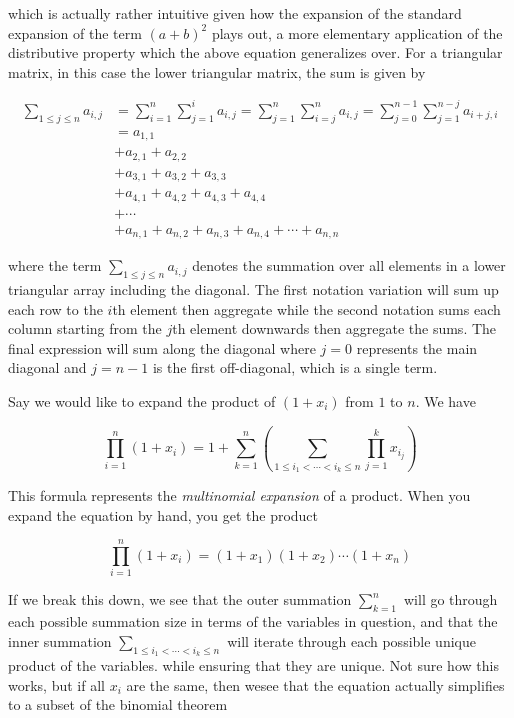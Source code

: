 \documentclass[12pt]{article}
\begin{document}
which is actually rather intuitive given how the expansion of the standard expansion of the term $(a+b)^2$ plays out, a more elementary application of the distributive property which the above equation generalizes over. For a triangular matrix, in this case the lower triangular matrix, the sum is given by

\begin{align*}
    \sum_{1 \leq j \leq n}^{} a_{i,j} &= \sum_{i=1}^{n} \sum_{j=1}^{i} a_{i, j} = 
    \sum_{j=1}^{n} \sum_{i=j}^{n} a_{i, j} = 
    \sum_{j=0}^{n-1} \sum_{j=1}^{n-j} a_{i+j, i} \\
    &= a_{1, 1} \\
    & + a_{2, 1} + a_{2, 2}  \\
    & + a_{3, 1} + a_{3, 2} + a_{3, 3} \\
    & + a_{4, 1} + a_{4, 2} + a_{4, 3} + a_{4, 4} \\
    & + \cdots \\
    & + a_{n, 1} + a_{n, 2} + a_{n, 3} + a_{n, 4} + \cdots + a_{n, n}
\end{align*}

where the term $\sum_{1 \leq j \leq n}^{} a_{i,j}$ denotes the summation over all elements in a lower triangular array including the diagonal. The first notation variation will sum up each row to the $i$th element then aggregate while the second notation sums each column starting from the $j$th element downwards then aggregate the sums. The final expression will sum along the diagonal where $j=0$ represents the main diagonal and $j=n-1$ is the first off-diagonal, which is a single term. 

\begin{example}
    Say we would like to expand the product of $\left(1 + x_i\right)$ from $1$ to $n$. We have 

    $$\prod_{i=1}^{n} \left(1 + x_i\right) = 1 + \sum_{k=1}^{n} \left(\sum_{1 \leq i_1 < \cdots < i_k \leq n} \prod_{j=1}^{k} x_{i_j}\right)$$
\end{example}

This formula represents the \textit{multinomial expansion} of a product. When you expand the equation by hand, you get the product

$$\prod_{i=1}^{n} \left(1 + x_i\right) = (1 + x_1)(1 + x_2)\cdots(1 + x_n)$$

If we break this down, we see that the outer summation $\sum_{k=1}^{n}$ will go through each possible summation size in terms of the variables in question, and that the inner summation $\sum_{1 \leq i_1 < \cdots < i_k \leq n}$ will iterate through each possible unique product of the variables. while ensuring that they are unique. Not sure how this works, but if all $x_i$ are the same, then wesee that the equation actually simplifies to a subset of the binomial theorem 
\end{document}
